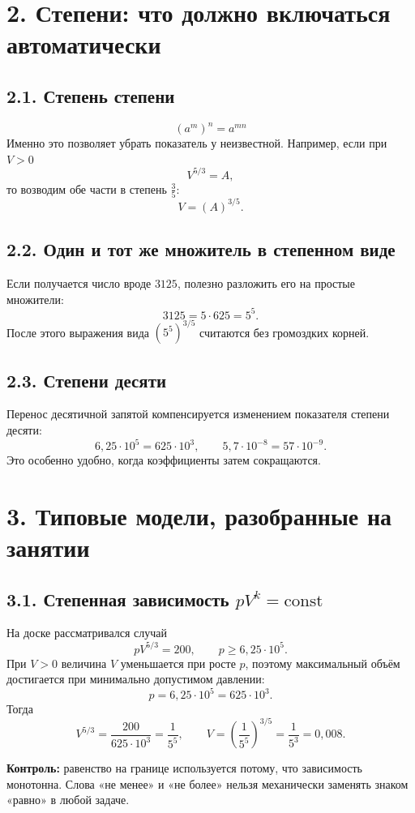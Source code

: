 \documentclass[a4paper,12pt]{article}
\newcommand{\formula}[1]{\[\displaystyle #1\]}
\begin{document}
\section*{2. Степени: что должно включаться автоматически}

\subsection*{2.1. Степень степени}
\formula{\left(a^m\right)^n=a^{mn}}
Именно это позволяет убрать показатель у неизвестной. Например, если при $V>0$
\formula{V^{5/3}=A,}
то возводим обе части в степень $\frac35$:
\formula{V=\left(A\right)^{3/5}.}

\subsection*{2.2. Один и тот же множитель в степенном виде}
Если получается число вроде $3125$, полезно разложить его на простые множители:
\formula{3125=5\cdot625=5^5.}
После этого выражения вида $\left(5^5\right)^{3/5}$ считаются без громоздких корней.

\subsection*{2.3. Степени десяти}
Перенос десятичной запятой компенсируется изменением показателя степени десяти:
\formula{6{,}25\cdot10^5=625\cdot10^3,\qquad 5{,}7\cdot10^{-8}=57\cdot10^{-9}.}
Это особенно удобно, когда коэффициенты затем сокращаются.

\section*{3. Типовые модели, разобранные на занятии}

\subsection*{3.1. Степенная зависимость $pV^k=\mathrm{const}$}
На доске рассматривался случай
\formula{pV^{5/3}=200,\qquad p\ge 6{,}25\cdot10^5.}
При $V>0$ величина $V$ уменьшается при росте $p$, поэтому максимальный объём достигается при минимально допустимом давлении:
\formula{p=6{,}25\cdot10^5=625\cdot10^3.}
Тогда
\formula{V^{5/3}=\frac{200}{625\cdot10^3}=\frac1{5^5},\qquad
V=\left(\frac1{5^5}\right)^{3/5}=\frac1{5^3}=0{,}008.}

\textbf{Контроль:} равенство на границе используется потому, что зависимость монотонна. Слова «не менее» и «не более» нельзя механически заменять знаком «равно» в любой задаче.
\end{document}
